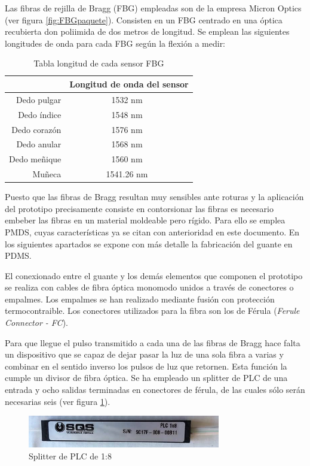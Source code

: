 Las fibras de rejilla de Bragg (FBG) empleadas son de la empresa Micron Optics (ver figura \ref{fig:FBGpaquete}). Consisten en un FBG centrado en una óptica recubierta don poliimida de dos metros de longitud. Se emplean las siguientes longitudes de onda para cada FBG según la flexión a medir:

\begin{table}[H]
	\centering
	\begin{tabular}[t]{|r|c|}
		\hline
		& Longitud de onda del sensor\\
		\hline
		\hline
		Dedo pulgar & 1532 nm \\
		\hline
		Dedo índice & 1548 nm \\
		\hline
		Dedo corazón & 1576 nm \\
		\hline
		Dedo anular & 1568 nm \\
		\hline
		Dedo meñique & 1560 nm \\
		\hline
		Muñeca & 1541.26 nm \\
		\hline
	\end{tabular}
	\caption{Tabla longitud de cada sensor FBG}
	\label{tabla:mmedidas 80 cm}
\end{table}

Puesto que las fibras de Bragg resultan muy sensibles ante roturas y la aplicación del prototipo precisamente consiste en contorsionar las fibras es necesario embeber las fibras en un material moldeable pero rígido. Para ello se emplea PMDS, cuyas características ya se citan con anterioridad en este documento. En los siguientes apartados se expone con más detalle la fabricación del guante en PDMS. 

El conexionado entre el guante y los demás elementos que componen el prototipo se realiza con cables de fibra óptica monomodo unidos a través de conectores o empalmes. Los empalmes se han realizado mediante fusión con protección termocontraible. Los conectores utilizados para la fibra son los de Férula (\textit{Ferule Connector - FC}).

Para que llegue el pulso transmitido a cada una de las fibras de Bragg hace falta un dispositivo que se capaz de dejar pasar la luz de una sola fibra a varias y combinar en el sentido inverso los pulsos de luz que retornen. Esta función la cumple un divisor de fibra óptica. Se ha empleado un splitter de PLC de una entrada y ocho salidas terminadas en conectores de férula, de las cuales sólo serán necesarias seis (ver figura \ref{fig:splitter}).

\begin{figure}[H]
	\centering
	\includegraphics[width=0.75\textwidth]{./img/splitter1a8}
	\caption{Splitter de PLC de 1:8} \label{fig:splitter}
\end{figure}

